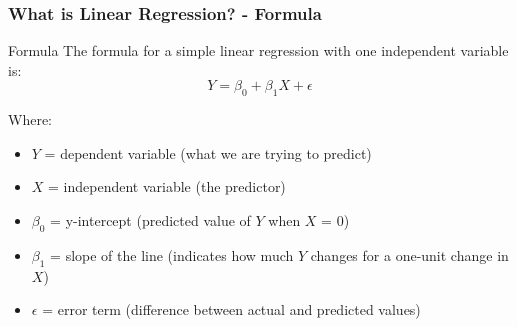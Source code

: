 \documentclass[aspectratio=169]{beamer}
\begin{document}
\begin{frame}[fragile]
    \frametitle{What is Linear Regression? - Formula}
    
    \begin{block}{Formula}
        The formula for a simple linear regression with one independent variable is:
        \begin{equation}
            Y = \beta_0 + \beta_1 X + \epsilon 
        \end{equation}
        
        Where:
        \begin{itemize}
            \item \( Y \) = dependent variable (what we are trying to predict)
            \item \( X \) = independent variable (the predictor)
            \item \( \beta_0 \) = y-intercept (predicted value of \( Y \) when \( X \) = 0)
            \item \( \beta_1 \) = slope of the line (indicates how much \( Y \) changes for a one-unit change in \( X \))
            \item \( \epsilon \) = error term (difference between actual and predicted values)
        \end{itemize}
    \end{block}

\end{frame}
\end{document}
